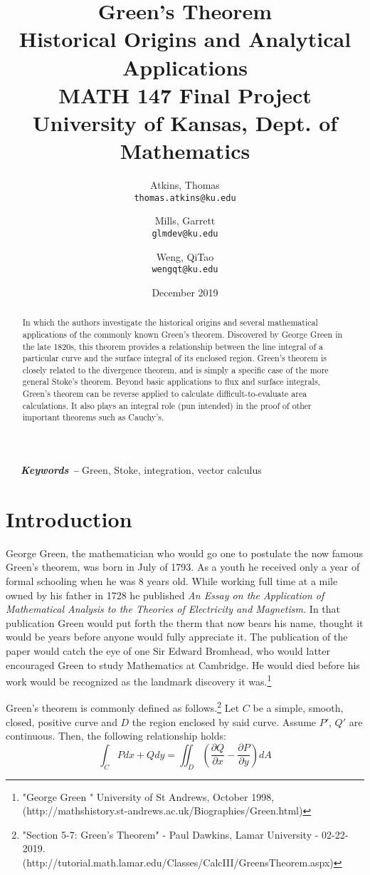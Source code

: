 \documentclass[11pt,English]{article}
\title{
Green's Theorem\\
    \large Historical Origins and Analytical Applications\\
    \small MATH 147 Final Project\\
    \small University of Kansas, Dept. of Mathematics
}
\author{
    Atkins, Thomas\\
    \texttt{thomas.atkins@ku.edu}
    \and
    Mills, Garrett\\
    \texttt{glmdev@ku.edu}
    \and
    Weng, QiTao\\
    \texttt{wengqt@ku.edu}
}
\date{December 2019}
\providecommand{\keywords}[1]
{
  \small	
  \-\ \-\ \-\ \textbf{\textit{Keywords --}} #1
}
\begin{document}
\maketitle
\begin{abstract}
    In which the authors investigate the historical origins and several mathematical applications of the commonly known Green's theorem. Discovered by George Green in the late 1820s, this theorem provides a relationship between the line integral of a particular curve and the surface integral of its enclosed region. Green's theorem is closely related to the divergence theorem, and is simply a specific case of the more general Stoke's theorem. Beyond basic applications to flux and surface integrals, Green's theorem can be reverse applied to calculate difficult-to-evaluate area calculations. It also plays an integral role (pun intended) in the proof of other important theorems such as Cauchy's.
\end{abstract}

\keywords{Green, Stoke, integration, vector calculus}

\section{Introduction}

George Green, the mathematician who would go one to postulate the now famous Green's theorem, was born in July of 1793. As a youth he received only a year of formal schooling when he was 8 years old. While working full time at a mile owned by his father in 1728 he published \emph{An Essay on the Application of Mathematical Analysis to the Theories of Electricity and Magnetism.} In that publication Green would put forth the therm that now bears his name, thought it would be years before anyone would fully appreciate it. The publication of the paper would catch the eye of one Sir Edward Bromhead, who would latter encouraged Green to study Mathematics at Cambridge. He would died before his work would be recognized as the landmark discovery it was.\footnote{"George Green
" University of St Andrews, October 1998, (http://mathshistory.st-andrews.ac.uk/Biographies/Green.html)}



Green's theorem is commonly defined as follows.\footnote{"Section 5-7: Green's Theorem" - Paul Dawkins, Lamar University - 02-22-2019. (http://tutorial.math.lamar.edu/Classes/CalcIII/GreensTheorem.aspx)} Let $C$ be a simple, smooth, closed, positive curve and $D$ the region enclosed by said curve. Assume $P'$, $Q'$ are continuous. Then, the following relationship holds:
$$
\int_C{ P dx + Q dy } = \iint_D{ \left( \frac{\partial Q}{\partial x} - \frac{\partial P}{\partial y} \right) dA }
$$
\end{document}
